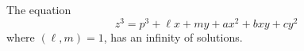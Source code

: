 \begin{proposition}\label{eq:111}
    The equation
\[
    z^3=p^3+\ell x+my+ax^2+bxy+cy^2
\]
    where $(\ell,m)=1$, has an infinity of solutions.
\end{proposition}
